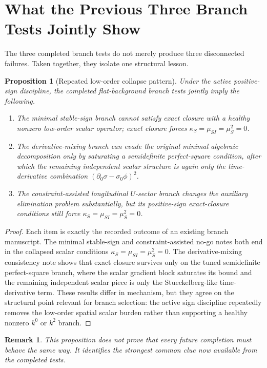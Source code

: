 \documentclass[11pt]{article}
\newtheorem{proposition}{Proposition}
\newtheorem{remark}{Remark}
\begin{document}
\section{What the Previous Three Branch Tests Jointly Show}

The three completed branch tests do not merely produce three disconnected failures. Taken together, they isolate one structural lesson.

\begin{proposition}[Repeated low-order collapse pattern]
Under the active positive-sign discipline, the completed flat-background branch tests jointly imply the following.
\begin{enumerate}
    \item The minimal stable-sign branch cannot satisfy exact closure with a healthy nonzero low-order scalar operator; exact closure forces \(\kappa_S=\mu_{SI}=\mu_S^2=0\).
    \item The derivative-mixing branch can evade the original minimal algebraic decomposition only by saturating a semidefinite perfect-square condition, after which the remaining independent scalar structure is again only the time-derivative combination \((\partial_0\sigma-\sigma_0\phi)^2\).
    \item The constraint-assisted longitudinal \(U\)-sector branch changes the auxiliary elimination problem substantially, but its positive-sign exact-closure conditions still force \(\kappa_S=\mu_{SI}=\mu_S^2=0\).
\end{enumerate}
\end{proposition}

\begin{proof}
Each item is exactly the recorded outcome of an existing branch manuscript. The minimal stable-sign and constraint-assisted no-go notes both end in the collapsed scalar conditions \(\kappa_S=\mu_{SI}=\mu_S^2=0\). The derivative-mixing consistency note shows that exact closure survives only on the tuned semidefinite perfect-square branch, where the scalar gradient block saturates its bound and the remaining independent scalar piece is only the Stueckelberg-like time-derivative term. These results differ in mechanism, but they agree on the structural point relevant for branch selection: the active sign discipline repeatedly removes the low-order spatial scalar burden rather than supporting a healthy nonzero \(k^0\) or \(k^2\) branch.
\end{proof}

\begin{remark}
This proposition does not prove that every future completion must behave the same way. It identifies the strongest common clue now available from the completed tests.
\end{remark}
\end{document}
